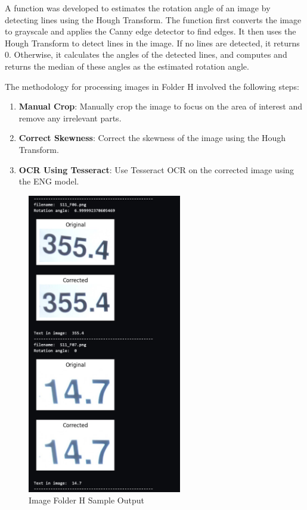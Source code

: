 A function was developed to estimates the rotation angle of an image by detecting lines using the Hough Transform. \cite{mukhopadhyaySurveyHoughTransform2015} The function first converts the image to grayscale and applies the Canny edge detector to find edges. It then uses the Hough Transform to detect lines in the image. If no lines are detected, it returns 0. Otherwise, it calculates the angles of the detected lines, and computes and returns the median of these angles as the estimated rotation angle.

The methodology for processing images in Folder H involved the following steps:

\begin{enumerate}
    \item \textbf{Manual Crop}: Manually crop the image to focus on the area of interest and remove any irrelevant parts.
    \item \textbf{Correct Skewness}: Correct the skewness of the image using the Hough Transform.
    \item \textbf{OCR Using Tesseract}: Use Tesseract OCR on the corrected image using the ENG model.

\end{enumerate}

\begin{figure}[ht]
    \centering
    \includegraphics[width=0.6\textwidth]{Figures/Methodology/sipa_11/sample_output.jpg}
    \caption[Image Folder H Sample Output]{Image Folder H Sample Output}
    \label{fig:Image Folder H Sample Output}
\end{figure}

